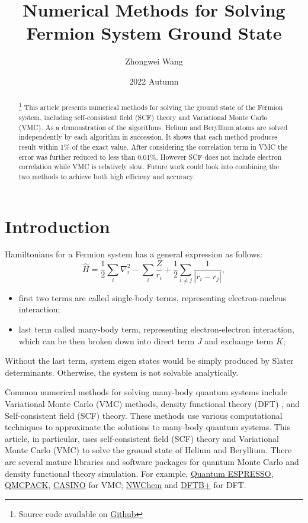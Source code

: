 \documentclass[11pt]{article}
\title{Numerical Methods for Solving Fermion System Ground State}
\author{Zhongwei Wang}
\date{2022 Autumn}
\begin{document}
\maketitle

\begin{abstract}\footnote[1]{Source code available on \href{https://github.com/Wang-Zhongwei/Many-body-ground-state-energy-by-VMC-and-SCF/tree/main}{Github}}
This article presents numerical methods for solving the ground state of the Fermion system, including self-consistent field (SCF) theory and Variational Monte Carlo (VMC). 
As a demonstration of the algorithms, Helium and Beryllium atoms are solved independently by each algorithm in succession. 
It shows that each method produces result within 1\% of the exact value. After considering the correlation term in VMC the error was further reduced to less than 0.01\%. However SCF does not include electron correlation while VMC is relatively slow. Future work could look into combining the two methods to achieve both high efficieny and accuracy. 

\end{abstract}

\section{Introduction}\label{section-introduction}
Hamiltonians for a Fermion system has a general expression as follows:
\begin{equation}\label{eq:hamiltonian}
\hat{H} = \frac{1}{2}\sum_{i}\nabla_i^2  - \sum_i \frac{Z}{r_i} + \frac{1}{2}\sum_{i \neq j} \frac{1}{|r_i-r_j|},
\end{equation}
\begin{itemize}
    \item first two terms are called single-body terms, representing electron-nucleus interaction;
    \item last term called many-body term, representing electron-electron interaction, which can be then broken down into 
    direct term $J$ and exchange term $K$; 
\end{itemize}
Without the last term, system eigen states would be simply produced by Slater determinants. Otherwise, the system is not solvable analytically.

Common numerical methods for solving many-body quantum systems include Variational Monte Carlo (VMC) \cite{First_VMC} methods, density functional theory (DFT) \cite{First-DFT}, and Self-consistent field (SCF) \cite{Early-SCF} theory. 
These methods use various computational techniques to approximate the solutions to many-body quantum systems. This article, in particular, uses self-consistent field (SCF) theory and Variational Monte Carlo (VMC) to solve the ground state of Helium and Beryllium. 
There are several mature libraries and software packages for quantum Monte Carlo and density functional theory simulation. For example, \href{https://www.quantum-espresso.org/}{Quantum ESPRESSO}, \href{https://qmcpack.org/}{QMCPACK}, \href{https://vallico.net/casinoqmc/}{CASINO} for VMC; \href{https://www.nwchem-sw.org/}{NWChem} and \href{https://dftbplus.org/}{DFTB+} for DFT. 
\end{document}
